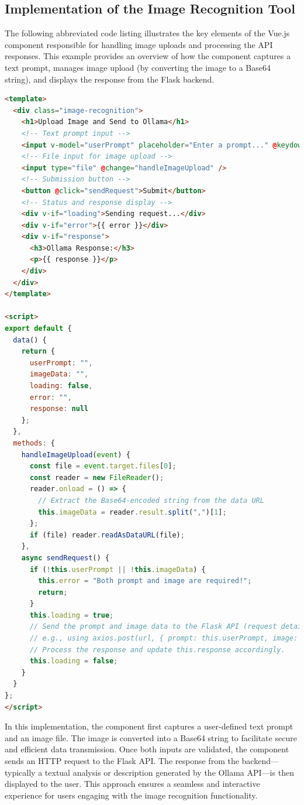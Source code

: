 \subsection{Implementation of the Image Recognition Tool}

The following abbreviated code listing illustrates the key elements of the Vue.js component responsible for handling image uploads and processing the API responses. This example provides an overview of how the component captures a text prompt, manages image upload (by converting the image to a Base64 string), and displays the response from the Flask backend.

\begin{lstlisting}[language=html, caption={Abbreviated Vue.js Component for Image Recognition}, frame=single]
<template>
  <div class="image-recognition">
    <h1>Upload Image and Send to Ollama</h1>
    <!-- Text prompt input -->
    <input v-model="userPrompt" placeholder="Enter a prompt..." @keydown.enter="sendRequest" />
    <!-- File input for image upload -->
    <input type="file" @change="handleImageUpload" />
    <!-- Submission button -->
    <button @click="sendRequest">Submit</button>
    <!-- Status and response display -->
    <div v-if="loading">Sending request...</div>
    <div v-if="error">{{ error }}</div>
    <div v-if="response">
      <h3>Ollama Response:</h3>
      <p>{{ response }}</p>
    </div>
  </div>
</template>

<script>
export default {
  data() {
    return {
      userPrompt: "",
      imageData: "",
      loading: false,
      error: "",
      response: null
    };
  },
  methods: {
    handleImageUpload(event) {
      const file = event.target.files[0];
      const reader = new FileReader();
      reader.onload = () => { 
        // Extract the Base64-encoded string from the data URL
        this.imageData = reader.result.split(",")[1];
      };
      if (file) reader.readAsDataURL(file);
    },
    async sendRequest() {
      if (!this.userPrompt || !this.imageData) {
        this.error = "Both prompt and image are required!";
        return;
      }
      this.loading = true;
      // Send the prompt and image data to the Flask API (request details omitted)
      // e.g., using axios.post(url, { prompt: this.userPrompt, image: this.imageData })
      // Process the response and update this.response accordingly.
      this.loading = false;
    }
  }
};
</script>
\end{lstlisting}

In this implementation, the component first captures a user-defined text prompt and an image file. The image is converted into a Base64 string to facilitate secure and efficient data transmission. Once both inputs are validated, the component sends an HTTP request to the Flask API. The response from the backend—typically a textual analysis or description generated by the Ollama API—is then displayed to the user. This approach ensures a seamless and interactive experience for users engaging with the image recognition functionality.


